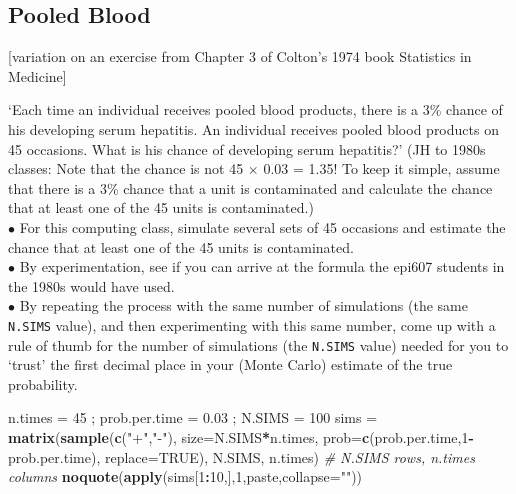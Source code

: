 \documentclass[]{book}
\newenvironment{Shaded}{\begin{snugshade}}{\end{snugshade}}
\newcommand{\CommentTok}[1]{\textcolor[rgb]{0.56,0.35,0.01}{\textit{#1}}}
\newcommand{\DataTypeTok}[1]{\textcolor[rgb]{0.13,0.29,0.53}{#1}}
\newcommand{\DecValTok}[1]{\textcolor[rgb]{0.00,0.00,0.81}{#1}}
\newcommand{\FloatTok}[1]{\textcolor[rgb]{0.00,0.00,0.81}{#1}}
\newcommand{\KeywordTok}[1]{\textcolor[rgb]{0.13,0.29,0.53}{\textbf{#1}}}
\newcommand{\NormalTok}[1]{#1}
\newcommand{\OperatorTok}[1]{\textcolor[rgb]{0.81,0.36,0.00}{\textbf{#1}}}
\newcommand{\OtherTok}[1]{\textcolor[rgb]{0.56,0.35,0.01}{#1}}
\newcommand{\StringTok}[1]{\textcolor[rgb]{0.31,0.60,0.02}{#1}}
\begin{document}
\hypertarget{pooled-blood}{%
\subsection{Pooled Blood}\label{pooled-blood}}

{[}variation on an exercise from Chapter 3 of Colton's 1974 book Statistics in Medicine{]}

`Each time an individual receives pooled blood products, there is a 3\% chance of his developing serum hepatitis. An individual receives pooled blood products on 45 occasions. What is his chance of developing serum hepatitis?' (JH to 1980s classes: Note that the chance is not 45 \(\times\) 0.03 = 1.35! To keep it simple, assume that there is a 3\% chance that a unit is contaminated and calculate the chance that at least one of the 45 units is contaminated.)\\
\(\bullet\) For this computing class, simulate several sets of 45 occasions and estimate the chance that at least one of the 45 units is contaminated.\\
\(\bullet\) By experimentation, see if you can arrive at the formula the epi607 students in the 1980s would have used.\\
\(\bullet\) By repeating the process with the same number of simulations (the same \texttt{N.SIMS} value), and then experimenting with this same number, come up with a rule of thumb for the number of simulations (the \texttt{N.SIMS} value) needed for you to `trust' the first decimal place in your (Monte Carlo) estimate of the true probability.

\begin{Shaded}
\begin{Highlighting}[]
\NormalTok{n.times =}\StringTok{ }\DecValTok{45}\NormalTok{ ; prob.per.time =}\StringTok{ }\FloatTok{0.03}\NormalTok{ ; N.SIMS =}\StringTok{ }\DecValTok{100}
\NormalTok{sims =}\StringTok{ }\KeywordTok{matrix}\NormalTok{(}\KeywordTok{sample}\NormalTok{(}\KeywordTok{c}\NormalTok{(}\StringTok{"+"}\NormalTok{,}\StringTok{"-"}\NormalTok{),}
                     \DataTypeTok{size=}\NormalTok{N.SIMS}\OperatorTok{*}\NormalTok{n.times,}
                     \DataTypeTok{prob=}\KeywordTok{c}\NormalTok{(prob.per.time,}\DecValTok{1}\OperatorTok{-}\NormalTok{prob.per.time),}
                     \DataTypeTok{replace=}\OtherTok{TRUE}\NormalTok{),}
\NormalTok{              N.SIMS, n.times) }\CommentTok{# N.SIMS rows, n.times columns}
\KeywordTok{noquote}\NormalTok{(}\KeywordTok{apply}\NormalTok{(sims[}\DecValTok{1}\OperatorTok{:}\DecValTok{10}\NormalTok{,],}\DecValTok{1}\NormalTok{,paste,}\DataTypeTok{collapse=}\StringTok{""}\NormalTok{))}
\end{Highlighting}
\end{Shaded}
\end{document}
